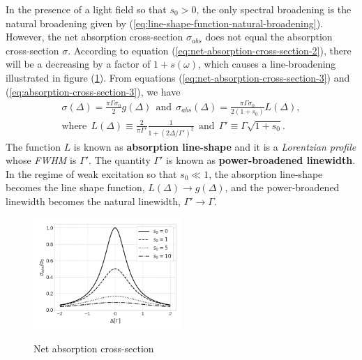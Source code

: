 {In the presence of a light field so that $ s_0 > 0 $, the only spectral broadening is the natural broadening given by (\ref{eq:line-shape-function-natural-broadening}). However, the net absorption cross-section $ \sigma_{abs} $ does not equal the absorption cross-section $ \sigma $. According to equation (\ref{eq:net-absorption-cross-section-2}), there will be a decreasing by a factor of $ 1 + s(\omega) $, which causes a line-broadening illustrated in figure (\ref{fig:net-absorption-cross-section}). From equations (\ref{eq:net-absorption-cross-section-3}) and (\ref{eq:absorption-cross-section-3}), we have
\begin{gather}
	\sigma(\Delta) = \frac{\pi \Gamma \sigma_0}{2} g(\Delta)\ \ \textrm{and}\ \ \sigma_{abs}(\Delta) = \frac{\pi \Gamma \sigma_0}{2(1 + s_0)} L(\Delta),
	\\
	\textrm{where}\ \ L(\Delta) \equiv \frac{2}{\pi \Gamma'} \frac{1}{1 + (2\Delta / \Gamma')^2}\ \ \textrm{and}\ \ \Gamma' \equiv \Gamma \sqrt{1 + s_0}.
	\label{eq:absorption-line-shape}
\end{gather}
The function $ L $ is known as \textbf{absorption line-shape} and it is a \textit{Lorentzian profile} whose \textit{FWHM} is $ \Gamma' $. The quantity $ \Gamma' $ is known as \textbf{power-broadened linewidth}. In the regime of weak excitation so that $ s_0 \ll 1 $, the absorption line-shape becomes the line shape function, $ L(\Delta) \rightarrow g(\Delta) $, and the power-broadened linewidth becomes the natural linewidth, $ \Gamma' \rightarrow \Gamma $.

\begin{figure}[!ht]
	\centering
	\caption{Net absorption cross-section}
	\vspace{-5pt}
	\includegraphics[width=0.5\textwidth]{USPSC-img/net_absorption_cross_section.png}
	\vspace{-5pt}
	\label{fig:net-absorption-cross-section}
\end{figure}

}
